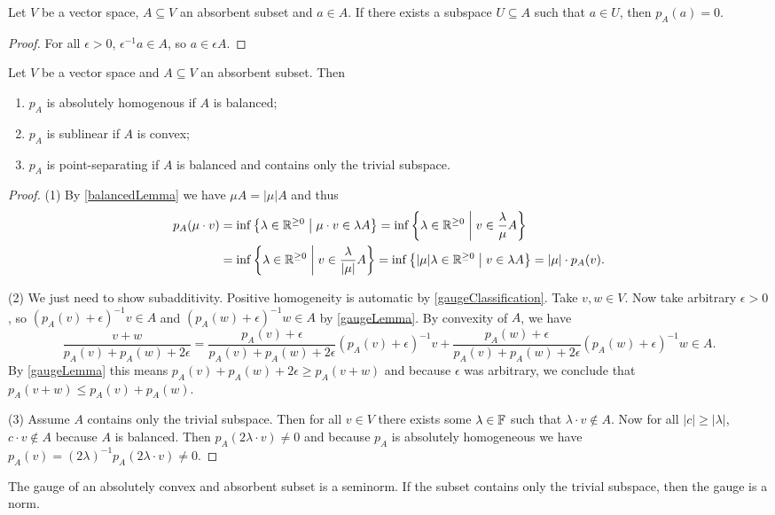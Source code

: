 \begin{lemma} \label{gaugeZeroLemma}
Let $V$ be a vector space, $A\subseteq V$ an absorbent subset and $a\in A$. If there exists a subspace $U\subseteq A$ such that $a\in U$, then $p_A(a) = 0$.
\end{lemma}
\begin{proof}
For all $\epsilon > 0$, $\epsilon^{-1}a\in A$, so $a\in \epsilon A$.
\end{proof}

\begin{proposition} \label{gaugeProperties}
Let $V$ be a vector space and $A\subseteq V$ an absorbent subset. Then
\begin{enumerate}
\item $p_A$ is absolutely homogenous if $A$ is balanced;
\item $p_A$ is sublinear if $A$ is convex;
\item $p_A$ is point-separating if $A$ is balanced and contains only the trivial subspace.
\end{enumerate}
\end{proposition}
\begin{proof}
(1) By \ref{balancedLemma} we have $\mu A = |\mu| A$ and thus
\begin{align*}
p_A(\mu\cdot v) &= \inf\left\{ \lambda\in \mathbb{R}^{\geq 0} \;\middle|\; \mu\cdot v\in \lambda A \right\} = \inf\left\{ \lambda\in \mathbb{R}^{\geq 0} \;\middle|\; v\in \frac{\lambda}{\mu} A \right\} \\
&= \inf\left\{ \lambda\in \mathbb{R}^{\geq 0} \;\middle|\; v\in \frac{\lambda}{|\mu|} A \right\} = \inf\left\{ |\mu|\lambda\in \mathbb{R}^{\geq 0} \;\middle|\; v\in \lambda A \right\} = |\mu|\cdot p_A(v).
\end{align*}

(2) We just need to show subadditivity. Positive homogeneity is automatic by \ref{gaugeClassification}. Take $v,w\in V$. Now take arbitrary $\epsilon > 0$, so $(p_A(v)+\epsilon)^{-1}v \in A$ and $(p_A(w)+\epsilon)^{-1}w \in A$ by \ref{gaugeLemma}. By convexity of $A$, we have
\[ \frac{v+w}{p_A(v)+p_A(w)+2\epsilon} = \frac{p_A(v)+\epsilon}{p_A(v)+p_A(w)+2\epsilon}(p_A(v)+\epsilon)^{-1}v + \frac{p_A(w)+\epsilon}{p_A(v)+p_A(w)+2\epsilon}(p_A(w)+\epsilon)^{-1}w \in A. \]
By \ref{gaugeLemma} this means $p_A(v)+p_A(w)+2\epsilon \geq p_A(v+w)$ and because $\epsilon$ was arbitrary, we conclude that $p_A(v+w) \leq p_A(v)+p_A(w)$.

(3) Assume $A$ contains only the trivial subspace. Then for all $v\in V$ there exists some $\lambda\in \mathbb{F}$ such that $\lambda\cdot v\notin A$. Now for all $|c|\geq |\lambda|$, $c\cdot v\notin A$ because $A$ is balanced. Then $p_A(2\lambda\cdot v) \neq 0$ and because $p_A$ is absolutely homogeneous we have $p_A(v) = (2\lambda)^{-1}p_A(2\lambda\cdot v) \neq 0$.
\end{proof}
\begin{corollary}
The gauge of an absolutely convex and absorbent subset is a seminorm. If the subset contains only the trivial subspace, then the gauge is a norm.
\end{corollary}


